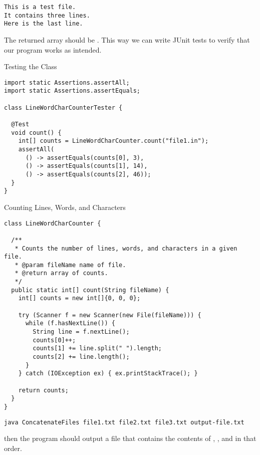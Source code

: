 
\par{
\begin{verbatim}
This is a test file.
It contains three lines.
Here is the last line.
\end{verbatim}
}
The returned array should be \ttt{[3, 14, 46]}. This way we can write JUnit tests to verify that our program works as intended.

\begin{cl}[]{Testing the  Class}
\begin{lstlisting}[language=MyJava]
import static Assertions.assertAll;
import static Assertions.assertEquals;

class LineWordCharCounterTester {

  @Test
  void count() {
    int[] counts = LineWordCharCounter.count("file1.in");
    assertAll(
      () -> assertEquals(counts[0], 3),
      () -> assertEquals(counts[1], 14),
      () -> assertEquals(counts[2], 46));
  }
}
\end{lstlisting}
\end{cl}

\begin{cl}[]{Counting Lines, Words, and Characters}
\begin{lstlisting}[language=MyJava]
class LineWordCharCounter {

  /**
   * Counts the number of lines, words, and characters in a given file.
   * @param fileName name of file.
   * @return array of counts.
   */
  public static int[] count(String fileName) {
    int[] counts = new int[]{0, 0, 0};

    try (Scanner f = new Scanner(new File(fileName))) {
      while (f.hasNextLine()) {
        String line = f.nextLine();
        counts[0]++;
        counts[1] += line.split(" ").length;
        counts[2] += line.length();
      }
    } catch (IOException ex) { ex.printStackTrace(); }

    return counts;
  }
}
\end{lstlisting}
\end{cl}

\par{
\begin{verbatim}
java ConcatenateFiles file1.txt file2.txt file3.txt output-file.txt
\end{verbatim}
}
then the program should output a file  that contains the contents of , , and  in that order. 

